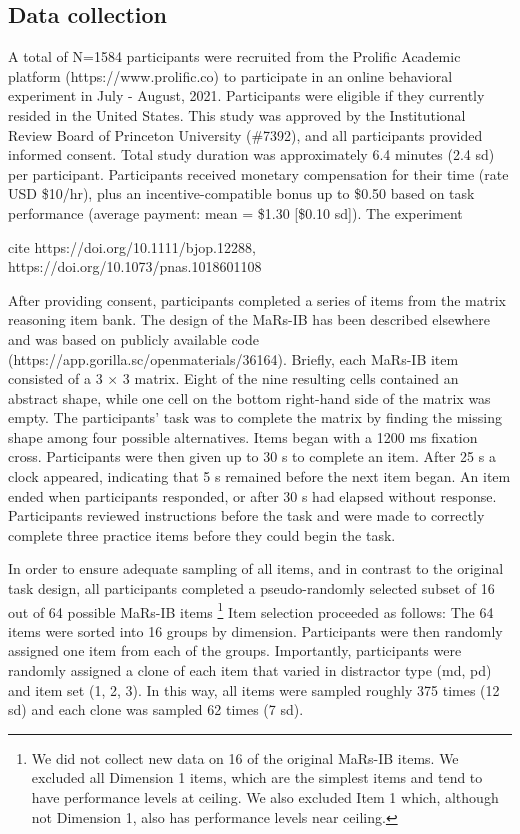 \documentclass[a4paper,man,natbib]{apa6}
\begin{document}
\subsection{Data collection}

A total of N=1584 participants were recruited from the Prolific Academic platform (https://www.prolific.co) to participate in an online behavioral experiment in July - August, 2021. Participants were eligible if they currently resided in the United States. This study was approved by the Institutional Review Board of Princeton University (\#7392), and all participants provided informed consent. Total study duration was approximately 6.4 minutes (2.4 sd) per participant. Participants received monetary compensation for their time (rate USD \$10/hr), plus an incentive-compatible bonus up to \$0.50 based on task performance (average payment: mean = \$1.30 [\$0.10 sd]). The experiment 

cite https://doi.org/10.1111/bjop.12288, https://doi.org/10.1073/pnas.1018601108

After providing consent, participants completed a series of items from the matrix reasoning item bank. The design of the MaRs-IB has been described elsewhere \citep{chierchia2019matrix} and was based on publicly available code (https://app.gorilla.sc/openmaterials/36164). Briefly, each MaRs-IB item consisted of a 3 × 3 matrix. Eight of the nine resulting cells contained an abstract shape, while one cell on the bottom right-hand side of the matrix was empty. The participants' task was to complete the matrix by finding the missing shape among four possible alternatives. Items began with a 1200 ms fixation cross. Participants were then given up to 30 s to complete an item. After 25 s a clock appeared, indicating that 5 s remained before the next item began. An item ended when participants responded, or after 30 s had elapsed without response. Participants reviewed instructions before the task and were made to correctly complete three practice items before they could begin the task. 

In order to ensure adequate sampling of all items, and in contrast to the original task design, all participants completed a pseudo-randomly selected subset of 16 out of 64 possible MaRs-IB items \footnote{We did not collect new data on 16 of the original MaRs-IB items. We excluded all Dimension 1 items, which are the simplest items and tend to have performance levels at ceiling. We also excluded Item 1 which, although not Dimension 1, also has performance levels near ceiling.} Item selection proceeded as follows: The 64 items were sorted into 16 groups by dimension. Participants were then randomly assigned one item from each of the groups. Importantly, participants were randomly assigned a clone of each item that varied in distractor type (md, pd) and item set (1, 2, 3). In this way, all items were sampled roughly 375 times (12 sd) and each clone was sampled 62 times (7 sd). 
\end{document}

